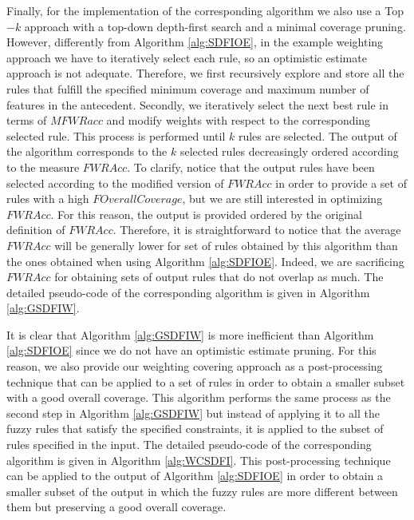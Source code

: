 Finally, for the implementation of the corresponding algorithm we also use a Top$-k$ approach with a top-down depth-first search and a minimal coverage pruning. However, differently from Algorithm \ref{alg:SDFIOE}, in the example weighting approach we have to iteratively select each rule, so an optimistic estimate approach is not adequate. Therefore, we first recursively explore and store all the rules that fulfill the specified minimum coverage and maximum number of features in the antecedent. Secondly, we iteratively select the next best rule in terms of $MFWRacc$ and modify weights with respect to the corresponding selected rule. This process is performed until $k$ rules are selected.  The output of the algorithm corresponds to the $k$ selected rules decreasingly ordered  according to the measure $FWRAcc$. To clarify, notice that the output rules have been selected according to the modified version of $FWRAcc$ in order to provide a set of rules with a high $FOverallCoverage$, but we are still interested in optimizing $FWRAcc$. For this reason, the output is provided ordered by the original definition of $FWRAcc$. Therefore, it is straightforward to notice that the average $FWRAcc$ will be generally lower for set of rules obtained by this algorithm than the ones obtained when using Algorithm \ref{alg:SDFIOE}. Indeed, we are sacrificing $FWRAcc$ for obtaining sets of output rules that do not overlap as much. The detailed pseudo-code of the corresponding algorithm is given in Algorithm \ref{alg:GSDFIW}.

It is clear that Algorithm \ref{alg:GSDFIW} is more inefficient than Algorithm \ref{alg:SDFIOE} since we do not have an optimistic estimate pruning. For this reason, we also provide our weighting covering approach as a post-processing technique that can be applied to a set of rules in order to obtain a smaller subset with a good overall coverage. This algorithm performs the same process as the second step in Algorithm \ref{alg:GSDFIW} but instead of applying it to all the fuzzy rules that satisfy the specified constraints, it is applied to the subset of rules specified in the input. The detailed pseudo-code of the corresponding algorithm is given in Algorithm \ref{alg:WCSDFI}. This post-processing technique can be applied to the output of Algorithm \ref{alg:SDFIOE} in order to obtain a smaller subset of the output in which the fuzzy rules are more different between them but preserving a good overall coverage.

